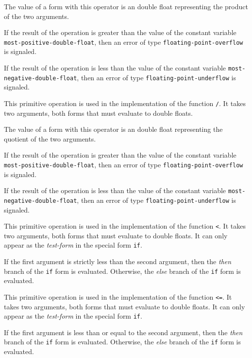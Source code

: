 The value of a form with this operator is an double float
representing the product of the two arguments.

If the result of the operation is greater than the value of the
constant variable \texttt{most-positive-double-float}, then an error of
type \texttt{floating-point-overflow} is signaled.

If the result of the operation is less than the value of the constant
variable \texttt{most-negative-double-float}, then an error of type
\texttt{floating-point-underflow} is signaled.


This primitive operation is used in the implementation of the
\commonlisp{} function \texttt{/}.  It takes two arguments, both forms
that must evaluate to double floats.

The value of a form with this operator is an double float
representing the quotient of the two arguments.

If the result of the operation is greater than the value of the
constant variable \texttt{most-positive-double-float}, then an error of
type \texttt{floating-point-overflow} is signaled.

If the result of the operation is less than the value of the constant
variable \texttt{most-negative-double-float}, then an error of type
\texttt{floating-point-underflow} is signaled.


This primitive operation is used in the implementation of the
\commonlisp{} function \texttt{<}.  It takes two arguments, both forms
that must evaluate to double floats.  It can only appear as the
\emph{test-form} in the special form \texttt{if}.

If the first argument is strictly less than the second argument, then
the \emph{then} branch of the \texttt{if} form is evaluated.
Otherwise, the \emph{else} branch of the \texttt{if} form is
evaluated.


This primitive operation is used in the implementation of the
\commonlisp{} function \texttt{<=}.  It takes two arguments, both forms
that must evaluate to double floats.  It can only appear as the
\emph{test-form} in the special form \texttt{if}.

If the first argument is less than or equal to the second argument,
then the \emph{then} branch of the \texttt{if} form is evaluated.
Otherwise, the \emph{else} branch of the \texttt{if} form is
evaluated.

